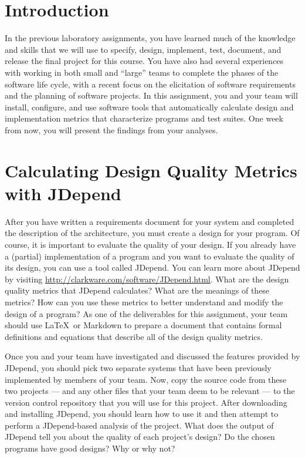 

\usepackage[compact]{titlesec}



\section*{Introduction}

In the previous laboratory assignments, you have learned much of the knowledge and skills that we will use to specify,
design, implement, test, document, and release the final project for this course.  You have also had several experiences
with working in both small and ``large'' teams to complete the phases of the software life cycle, with a recent focus on
the elicitation of software requirements and the planning of software projects.  In this assignment, you and your team
will install, configure, and use software tools that automatically calculate design and implementation metrics that
characterize programs and test suites.  One week from now, you will present the findings from your analyses.

\section*{Calculating Design Quality Metrics with JDepend}

After you have written a requirements document for your system and completed the description of the architecture, you
must create a design for your program.  Of course, it is important to evaluate the quality of your design.  If you
already have a (partial) implementation of a program and you want to evaluate the quality of its design, you can use a
tool called JDepend.  You can learn more about JDepend by visiting \url{http://clarkware.com/software/JDepend.html}.
What are the design quality metrics that JDepend calculates? What are the meanings of these metrics? How can you use
these metrics to better understand and modify the design of a program? As one of the deliverables for this
assignment, your team should use \LaTeX\ or Markdown to prepare a document that contains formal definitions and
equations that describe all of the design quality metrics.

Once you and your team have investigated and discussed the features provided by JDepend, you should pick two separate
systems that have been previously implemented by members of your team. Now, copy the source code from these two projects
--- and any other files that your team deem to be relevant --- to the version control repository that you will use for
this project.  After downloading and installing JDepend, you should learn how to use it and then attempt to perform a
JDepend-based analysis of the project. What does the output of JDepend tell you about the quality of each project's design? Do
the chosen programs have good designs? Why or why not?

